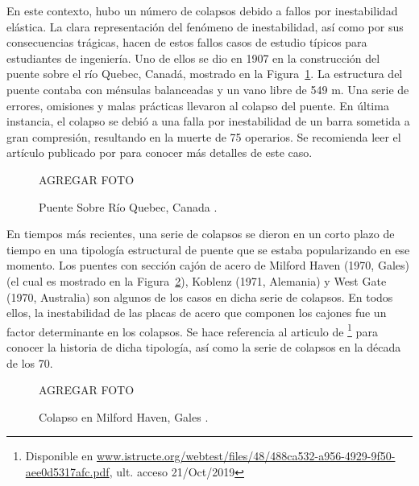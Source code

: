 En este contexto, hubo un número de colapsos debido a fallos por inestabilidad elástica. La clara representación del fenómeno de inestabilidad, así como por sus consecuencias trágicas, hacen de estos fallos casos de estudio típicos para estudiantes de ingeniería. Uno de ellos se dio en 1907 en la construcción del puente sobre el río Quebec, Canadá, mostrado en la Figura~\ref{fig:Quebec}. La estructura del puente contaba con ménsulas balanceadas y un vano libre de 549 m. Una serie de errores, omisiones y malas prácticas llevaron al colapso del puente. En última instancia, el colapso se debió a una falla por inestabilidad de un barra sometida a gran compresión, resultando en la muerte de 75 operarios. Se recomienda leer el artículo publicado por \cite{Brady} para conocer más detalles de este caso.

\begin{figure}[htb]
  \centering
  AGREGAR FOTO
	\caption{Puente Sobre Río Quebec, Canada \citep{Brady}.}
	\label{fig:Quebec}
\end{figure}

En tiempos más recientes, una serie de colapsos se dieron en un corto plazo de tiempo en una tipología estructural de puente que se estaba popularizando en ese momento. Los puentes con sección cajón de acero de Milford Haven (1970, Gales) (el cual es mostrado en la Figura~\ref{fig:Milford}), Koblenz (1971, Alemania) y West Gate (1970, Australia) son algunos de los casos en dicha serie de colapsos. En todos ellos, la inestabilidad de las placas de acero que componen los cajones fue un factor determinante en los colapsos. Se hace referencia al articulo de \cite{Firth}\footnote{Disponible en \href{https://www.istructe.org/webtest/files/48/488ca532-a956-4929-9f50-aee0d5317afc.pdf}{www.istructe.org/webtest/files/48/488ca532-a956-4929-9f50-aee0d5317afc.pdf}, ult. acceso 21/Oct/2019} para conocer la historia de dicha tipología, así como la serie de colapsos en la década de los 70.

\begin{figure}[htb]
  \centering
  AGREGAR FOTO
	\caption{Colapso en Milford Haven, Gales \citep{Firth}.}
	\label{fig:Milford}
\end{figure}

